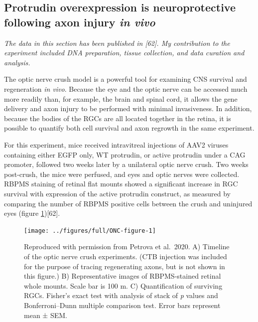 \documentclass[
  12pt,
  a4paper,
]{book}
\begin{document}
\hypertarget{protrudin-ONC}{%
\subsection{\texorpdfstring{Protrudin overexpression is neuroprotective following axon injury \emph{in vivo}}{Protrudin overexpression is neuroprotective following axon injury in vivo}}\label{protrudin-ONC}}

\emph{The data in this section has been published in {[}62{]}. My contribution to the experiment included DNA preparation, tissue collection, and data curation and analysis.}

The optic nerve crush model is a powerful tool for examining CNS survival and regeneration \emph{in vivo}. Because the eye and the optic nerve can be accessed much more readily than, for example, the brain and spinal cord, it allows the gene delivery and axon injury to be performed with minimal invasiveness. In addition, because the bodies of the RGCs are all located together in the retina, it is possible to quantify both cell survival and axon regrowth in the same experiment.

For this experiment, mice received intravitreal injections of AAV2 viruses containing either EGFP only, WT protrudin, or active protrudin under a CAG promoter, followed two weeks later by a unilateral optic nerve crush. Two weeks post-crush, the mice were perfused, and eyes and optic nerves were collected. RBPMS staining of retinal flat mounts showed a significant increase in RGC survival with expression of the active protrudin construct, as measured by comparing the number of RBPMS positive cells between the crush and uninjured eyes (figure \ref{fig:ONC-figure}){[}62{]}.



\begin{figure}
\texttt{[image: ../figures/full/ONC-figure-1]} \caption[RGC neuroprotection experiment from Petrova et al. 2020]{Reproduced with permission from Petrova et al.~2020. A) Timeline of the optic nerve crush experiments. (CTB injection was included for the purpose of tracing regenerating axons, but is not shown in this figure.) B) Representative images of RBPMS-stained retinal whole mounts. Scale bar is 100 \textmu{}m. C) Quantification of surviving RGCs. Fisher's exact test with analysis of stack of \emph{p} values and Bonferroni--Dunn multiple comparison test. Error bars represent mean ± SEM.}\label{fig:ONC-figure}
\end{figure}
\end{document}
